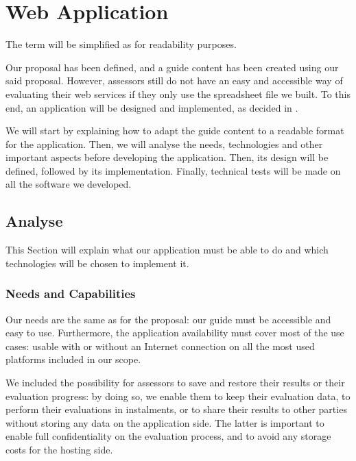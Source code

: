 \chapter{Web Application}
\label{chap:app}

The term  will be simplified as  for readability purposes.

Our proposal has been defined, and a guide content has been created using our said proposal. However, assessors still do not have an easy and accessible way of evaluating their web services if they only use the spreadsheet file we built. To this end, an application will be designed and implemented, as decided in .

We will start by explaining how to adapt the guide content to a readable format for the application. Then, we will analyse the needs, technologies and other important aspects before developing the application. Then, its design will be defined, followed by its implementation. Finally, technical tests will be made on all the software we developed.

\minitoc

\newpage

\section{Analyse}
\label{sec:app_analyse}

This Section will explain what our application must be able to do and which technologies will be chosen to implement it.

\subsection{Needs and Capabilities}
\label{subsec:app_analyse_needs}

Our needs are the same as for the proposal: our guide must be accessible and easy to use. Furthermore, the application availability must cover most of the use cases: usable with or without an Internet connection on all the most used platforms included in our scope.

We included the possibility for assessors to save and restore their results or their evaluation progress: by doing so, we enable them to keep their evaluation data, to perform their evaluations in instalments, or to share their results to other parties without storing any data on the application side. The latter is important to enable full confidentiality on the evaluation process, and to avoid any storage costs for the hosting side.

